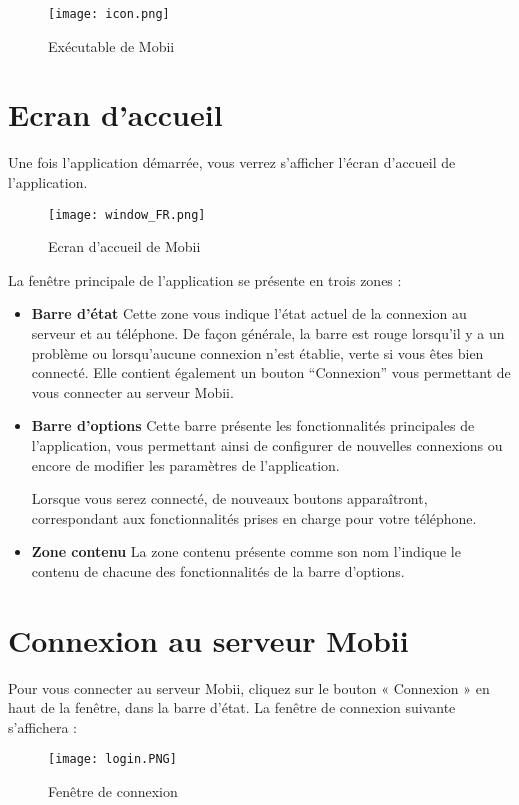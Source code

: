 \documentclass{koala-fr}
\begin{document}
\begin{figure}[!ht]
  \center
  \texttt{[image: icon.png]}
  \caption{Exécutable de Mobii}
\end{figure}

\section{Ecran d’accueil}
Une fois l’application démarrée, vous verrez s’afficher l’écran d’accueil de l’application.

\begin{figure}[!ht]
  \center
  \texttt{[image: window\_FR.png]}
  \caption{Ecran d'accueil de Mobii}
\end{figure}

La fenêtre principale de l’application se présente en trois zones :
\begin{itemize}
\item\textbf{Barre d’état}
\newline
Cette zone vous indique l’état actuel de la connexion au serveur et au téléphone. De façon générale, la barre est rouge lorsqu’il y a un problème ou lorsqu’aucune connexion n’est établie, verte si vous êtes bien connecté.
\newline
Elle contient également un bouton ``Connexion'' vous permettant de vous connecter au serveur Mobii.
\item\textbf{Barre d’options}
\newline
Cette barre présente les fonctionnalités principales de l’application, vous permettant ainsi de configurer de nouvelles connexions ou encore de modifier les paramètres de l’application.

Lorsque vous serez connecté, de nouveaux boutons apparaîtront, correspondant aux fonctionnalités prises en charge pour votre téléphone.
\item\textbf{Zone contenu}
\newline
La zone contenu présente comme son nom l’indique le contenu de chacune des fonctionnalités de la barre d’options.
\end{itemize}

\section{Connexion au serveur Mobii}
Pour vous connecter au serveur Mobii, cliquez sur le bouton « Connexion » en haut de la fenêtre, dans la barre d’état.
\newline
\newline
La fenêtre de connexion suivante s’affichera :
\begin{figure}[!ht]
  \center
  \texttt{[image: login.PNG]}
  \caption{Fenêtre de connexion}
\end{figure}
\end{document}
